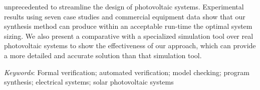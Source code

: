 unprecedented to streamline the design of photovoltaic systems. Experimental results using seven case studies and commercial equipment data show that our synthesis method can produce within an acceptable run-time the optimal system sizing. We also present a comparative with a specialized simulation tool over real photovoltaic systems to show the effectiveness of our approach, which can provide a more detailed and accurate solution than that simulation tool.



\textit{Keywords}: Formal verification; automated verification; model checking; program synthesis; electrical systems; solar photovoltaic systems
